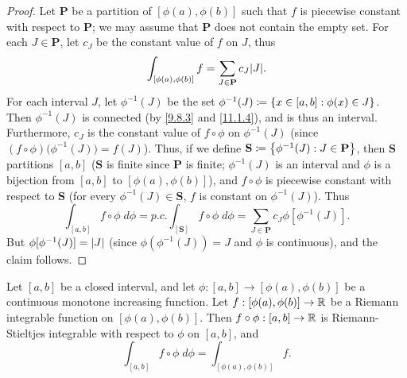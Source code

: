 \begin{proof}
  Let \(\mathbf{P}\) be a partition of \([\phi(a), \phi(b)]\) such that \(f\) is piecewise constant with respect to \(\mathbf{P}\);
  we may assume that \(\mathbf{P}\) does not contain the empty set.
  For each \(J \in \mathbf{P}\), let \(c_J\) be the constant value of \(f\) on \(J\), thus
  \[
    \int_{[\phi(a), \phi(b)]} f = \sum_{J \in \mathbf{P}} c_J \abs{J}.
  \]
  For each interval \(J\), let \(\phi^{-1}(J)\) be the set \(\phi^{-1}(J) \coloneqq \left\lbrace x \in [a, b] : \phi(x) \in J\right\rbrace\).
  Then \(\phi^{-1}(J)\) is connected (by \cref{9.8.3} and \cref{11.1.4}), and is thus an interval.
  Furthermore, \(c_J\) is the constant value of \(f \circ \phi\) on \(\phi^{-1}(J)\) (since \((f \circ \phi)\big(\phi^{-1}(J)\big) = f(J)\)).
  Thus, if we define \(\mathbf{S} \coloneqq \left\lbrace\phi^{-1} (J) : J \in \mathbf{P}\right\rbrace\), then \(\mathbf{S}\) partitions \([a, b]\)
  (\(\mathbf{S}\) is finite since \(\mathbf{P}\) is finite;
  \(\phi^{-1}(J)\) is an interval and \(\phi\) is a bijection from \([a, b]\) to \([\phi(a), \phi(b)]\)),
  and \(f \circ \phi\) is piecewise constant with respect to \(\mathbf{S}\) (for every \(\phi^{-1}(J) \in \mathbf{S}\), \(f\) is constant on \(\phi^{-1}(J)\)).
  Thus
  \[
    \int_{[a, b]} f \circ \phi \; d \phi = p.c. \int_{[\mathbf{S}]} f \circ \phi \; d \phi = \sum_{J \in \mathbf{P}} c_J \phi[\phi^{-1}(J)].
  \]
  But \(\phi[\phi^{-1}(J)] = \left\lvert J\right\rvert\) (since \(\phi(\phi^{-1}(J)) = J\) and \(\phi\) is continuous), and the claim follows.
\end{proof}

\begin{prop}\label{11.10.6}
  Let \([a, b]\) be a closed interval, and let \(\phi : [a, b] \to [\phi(a), \phi(b)]\) be a continuous monotone increasing function.
  Let \(f : [\phi(a), \phi(b)] \to \mathbb{R}\) be a Riemann integrable function on \([\phi(a), \phi(b)]\).
  Then \(f \circ \phi : [a, b] \to \mathbb{R}\) is Riemann-Stieltjes integrable with respect to \(\phi\) on \([a, b]\), and
  \[
    \int_{[a, b]} f \circ \phi \; d \phi = \int_{[\phi(a), \phi(b)]} f.
  \]
\end{prop}

